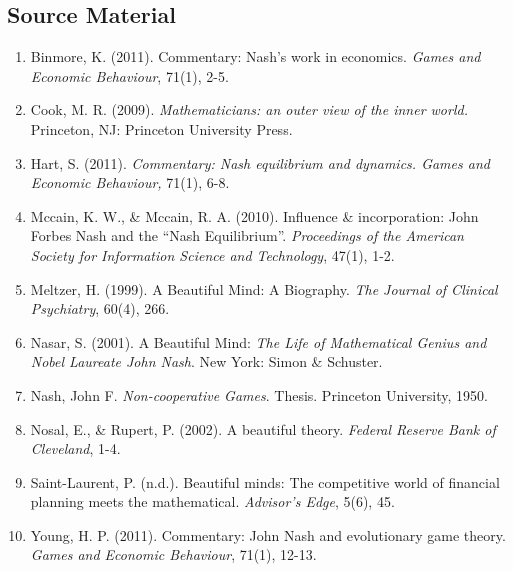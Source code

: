 \documentclass[11pt]{article}
\begin{document}
\subsection*{Source Material}


\begin{enumerate}
\item Binmore, K. (2011). Commentary: Nash's work in economics. \textit{Games and Economic Behaviour}, 71(1), 2-5.
\item Cook, M. R. (2009). \textit{Mathematicians: an outer view of the inner world.} Princeton, NJ: Princeton University Press.
\item Hart, S. (2011). \textit{Commentary: Nash equilibrium and dynamics. Games and Economic Behaviour,} 71(1), 6-8.
\item Mccain, K. W., \& Mccain, R. A. (2010). Influence \& incorporation: John Forbes Nash and the “Nash Equilibrium”. \textit{Proceedings of the American Society for Information Science and Technology}, 47(1), 1-2.
\item Meltzer, H. (1999). A Beautiful Mind: A Biography. \textit{The Journal of Clinical Psychiatry}, 60(4), 266.
\item Nasar, S. (2001). A Beautiful Mind: \textit{The Life of Mathematical Genius and Nobel Laureate John Nash}. New York: Simon \& Schuster.
\item Nash, John F. \textit{Non-cooperative Games}. Thesis. Princeton University, 1950.
\item Nosal, E., \& Rupert, P. (2002). A beautiful theory. \textit{Federal Reserve Bank of Cleveland}, 1-4.
\item Saint-Laurent, P. (n.d.). Beautiful minds: The competitive world of financial planning meets the mathematical.\textit{ Advisor's Edge}, 5(6), 45.
\item Young, H. P. (2011). Commentary: John Nash and evolutionary game theory. \textit{Games and Economic Behaviour}, 71(1), 12-13.
\end{enumerate}
\end{document}
